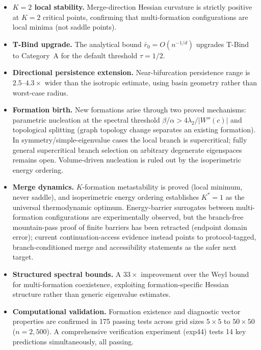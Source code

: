 \documentclass[lettersize,journal]{IEEEtran}
\begin{document}
\begin{itemize}
\item \textbf{$K = 2$ local stability.} Merge-direction Hessian curvature is strictly positive at $K = 2$ critical points, confirming that multi-formation configurations are local minima (not saddle points).

\item \textbf{T-Bind upgrade.} The analytical bound $\bar{r}_0 = O(n^{-1/d})$ upgrades T-Bind to Category~A for the default threshold $\tau = 1/2$.

\item \textbf{Directional persistence extension.} Near-bifurcation persistence range is $2.5$--$4.3\times$ wider than the isotropic estimate, using basin geometry rather than worst-case radius.

\item \textbf{Formation birth.} New formations arise through two proved mechanisms: parametric nucleation at the spectral threshold $\beta/\alpha > 4\lambda_2/|W''(c)|$ and topological splitting (graph topology change separates an existing formation). In symmetry/simple-eigenvalue cases the local branch is supercritical; fully general supercritical branch selection on arbitrary degenerate eigenspaces remains open. Volume-driven nucleation is ruled out by the isoperimetric energy ordering.

\item \textbf{Merge dynamics.} $K$-formation metastability is proved (local minimum, never saddle), and isoperimetric energy ordering establishes $K^*=1$ as the universal thermodynamic optimum. Energy-barrier surrogates between multi-formation configurations are experimentally observed, but the branch-free mountain-pass proof of finite barriers has been retracted (endpoint domain error); current continuation-access evidence instead points to protocol-tagged, branch-conditioned merge and accessibility statements as the safer next target.

\item \textbf{Structured spectral bounds.} A $33\times$ improvement over the Weyl bound for multi-formation coexistence, exploiting formation-specific Hessian structure rather than generic eigenvalue estimates.

\item \textbf{Computational validation.} Formation existence and diagnostic vector properties are confirmed in 175 passing tests across grid sizes $5 \times 5$ to $50 \times 50$ ($n = 2{,}500$). A comprehensive verification experiment (exp44) tests 14 key predictions simultaneously, all passing.
\end{itemize}
\end{document}
